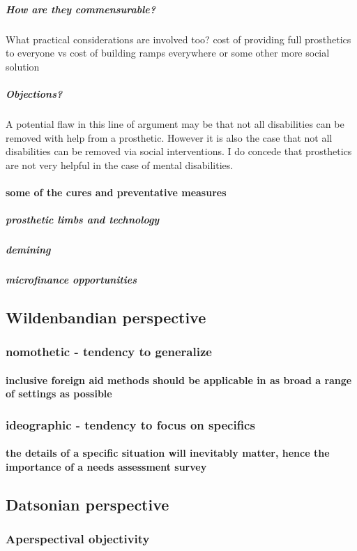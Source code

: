 \documentclass{lps}
\begin{document}
\subparagraph{How are they commensurable?}
What practical considerations are involved too?
cost of providing full prosthetics to everyone vs cost of building ramps everywhere or some other more social solution
\subparagraph{Objections?}
    A potential flaw in this line of argument may be that not all disabilities can be removed with help from a prosthetic. However it is also the case that not all disabilities can be removed via social interventions. I do concede that prosthetics are not very helpful in the case of mental disabilities. 

\paragraph{some of the cures and preventative measures}
\subparagraph{prosthetic limbs and technology}

\subparagraph{demining}

\subparagraph{microfinance opportunities}

\subsection{Wildenbandian perspective}
\subsubsection{nomothetic - tendency to generalize}
\paragraph{inclusive foreign aid methods should be applicable in as broad a
range of settings as possible}
\subsubsection{ ideographic - tendency to focus on specifics}
\paragraph{the details of a specific situation will inevitably matter, hence
the importance of a needs assessment survey}

\subsection{Datsonian perspective}
\subsubsection{Aperspectival objectivity}
\end{document}
